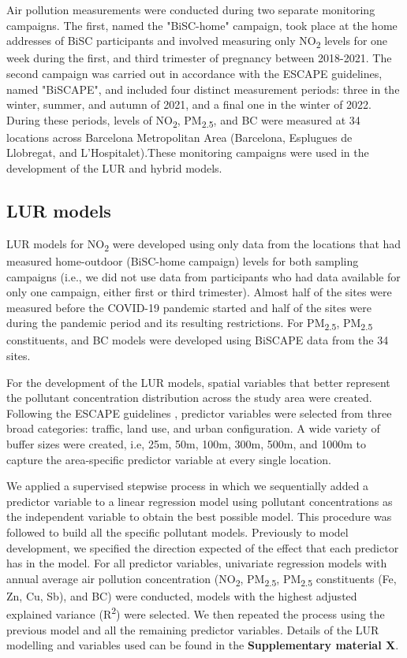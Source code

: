 \documentclass{article}
\begin{document}
Air pollution measurements were conducted during two separate monitoring campaigns. The first, named the "BiSC-home" campaign, took place at the home addresses of BiSC participants and involved measuring only NO\textsubscript{2} levels for one week during the first, and third trimester of pregnancy between 2018-2021. The second campaign was carried out in accordance with the ESCAPE guidelines, named "BiSCAPE", and included four distinct measurement periods: three in the winter, summer, and autumn of 2021, and a final one in the winter of 2022. During these periods, levels of NO\textsubscript{2}, PM\textsubscript{2.5}, and BC were measured at 34 locations across Barcelona Metropolitan Area (Barcelona, Esplugues de Llobregat, and L'Hospitalet).These monitoring campaigns were used in the development of the LUR and hybrid models.

\subsection{LUR models}

LUR models for NO\textsubscript{2}  were developed using only data from the locations that had measured home-outdoor (BiSC-home campaign) levels for both sampling campaigns (i.e., we did not use data from participants who had data available for only one campaign, either first or third trimester). Almost half of the sites were measured before the COVID-19 pandemic started and half of the sites were during the pandemic period and its resulting restrictions. For PM\textsubscript{2.5}, PM\textsubscript{2.5} constituents, and BC models were developed using BiSCAPE data from the 34 sites.

For the development of the LUR models, spatial variables that better represent the pollutant concentration distribution across the study area were created. Following the ESCAPE guidelines \cite{eeftens2012, beelen2013},  predictor variables were selected from three broad categories: traffic, land use, and urban configuration. A wide variety of buffer sizes were created, i.e, 25m, 50m, 100m, 300m, 500m, and 1000m to capture the area-specific predictor variable at every single location.

We applied a supervised stepwise process in which we sequentially added a predictor variable to a linear regression model using pollutant concentrations as the independent variable to obtain the best possible model. This procedure was followed to build all the specific pollutant models. Previously to model development, we specified the direction expected of the effect that each predictor has in the model. For all predictor variables, univariate regression models with annual average air pollution concentration (NO\textsubscript{2}, PM\textsubscript{2.5}, PM\textsubscript{2.5} constituents (Fe, Zn, Cu, Sb), and BC) were conducted, models with the highest adjusted explained variance (R\textsuperscript{2}) were selected. We then repeated the process using the previous model and all the remaining predictor variables. Details of the LUR modelling and variables used can be found in the \textbf{Supplementary material X}.
\end{document}
